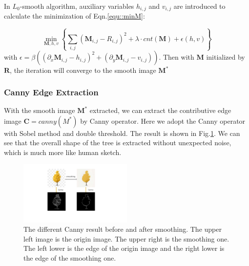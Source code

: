 \documentclass[10pt,twocolumn,letterpaper]{article}
\begin{document}
In $L_0$-smooth algorithm, auxiliary variables $h_{i, j}$ and $v_{i, j}$ are introduced to calculate the minimization of Eqn.\ref{equ::minM}:

\begin{equation}
  \min_{\bm{M}, h, v}\left\{\sum_{i, j}(\bm{M}_{i, j} - R_{i, j})^2 + \lambda \cdot cnt(\bm{M}) + \epsilon(h, v)  \right\}
  \label{equ::minMhv}
\end{equation}
with $\epsilon = \beta((\partial_x\bm{M}_{i, j} - h_{i,j})^2 + (\partial_y\bm{M}_{i, j}-v_{i, j}))$. Then with $\bm{M}$ initialized by $\bm{R}$, the iteration will converge to the smooth image $\bm{M^*}$

\subsubsection{Canny Edge Extraction}\label{subsubsec::canny}
With the smooth image $\mathbf{M^*}$ extracted, we can extract the contributive edge image $\mathbf{C} = canny(M^*)$ by Canny operator. Here we adopt the Canny operator with Sobel method and double threshold. The result is shown in Fig.\ref{fig::ceeimg}. We can see that the overall shape of the tree is extracted without unexpected noise, which is much more like human sketch.

\begin{figure}[htb]
  \centering
  \includegraphics[width = 0.5\textwidth]{figure/originsmoothcanny.pdf}
  \caption{The different Canny result before and after smoothing. The upper left image is the origin image. The upper right is the smoothing one. The left lower is the edge of the origin image and the right lower is the edge of the smoothing one.}
  \label{fig::ceeimg}
\end{figure}
\end{document}
